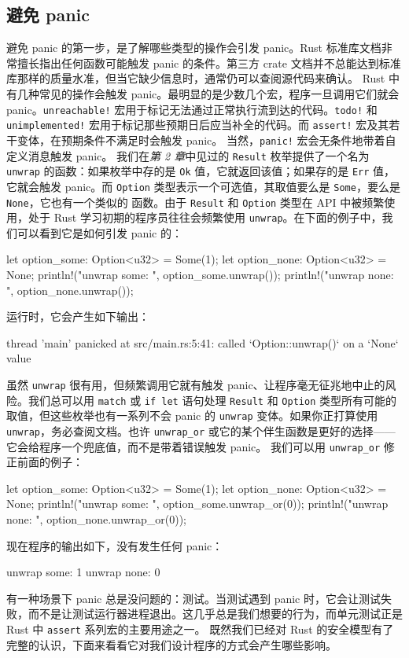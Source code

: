 \subsection{避免 panic}
\label{idx:idx_98423391}
避免 panic 的第一步，是了解哪些类型的操作会引发 panic。Rust 标准库文档非常擅长指出任何函数可能触发 panic 的条件。第三方 crate 文档并不总能达到标准库那样的质量水准，但当它缺少信息时，通常仍可以查阅源代码来确认。
Rust 中有几种常见的操作会触发 panic。最明显的是少数几个宏，程序一旦调用它们就会 panic。\texttt{unreachable!} 宏用于标记无法通过正常执行流到达的代码。\texttt{todo!} 和
\texttt{unimplemented!} 宏用于标记那些预期日后应当补全的代码。而
\texttt{assert!} 宏及其若干变体，在预期条件不满足时会触发 panic。
当然，\texttt{panic!} 宏会无条件地带着自定义消息触发 panic。
我们在\emph{第 2 章}中见过的 \texttt{Result} 枚举提供了一个名为 \texttt{unwrap} 的函数：如果枚举中存的是 \texttt{Ok} 值，它就返回该值；如果存的是 \texttt{Err} 值，它就会触发 panic。而
\texttt{Option} 类型表示一个可选值，其取值要么是 \texttt{Some}，要么是 \texttt{None}，它也有一个类似的
函数。由于 \texttt{Result} 和 \texttt{Option} 类型在 API 中被频繁使用，处于 Rust 学习初期的程序员往往会频繁使用 \texttt{unwrap}。在下面的例子中，我们可以看到它是如何引发 panic 的：
\begin{codebox}[rust]
let option_some: Option<u32> = Some(1);
let option_none: Option<u32> = None;
println!("unwrap some: {}", option_some.unwrap());
println!("unwrap none: {}", option_none.unwrap());
\end{codebox}
运行时，它会产生如下输出：
\begin{codebox}[rust]
thread 'main' panicked at src/main.rs:5:41:
called `Option::unwrap()` on a `None` value
\end{codebox}
\label{idx:idx_96896a5d}
虽然 \texttt{unwrap} 很有用，但频繁调用它就有触发 panic、让程序毫无征兆地中止的风险。我们总可以用 \texttt{match} 或 \texttt{if let} 语句处理 \texttt{Result} 和 \texttt{Option} 类型所有可能的取值，但这些枚举也有一系列不会 panic 的 \texttt{unwrap} 变体。如果你正打算使用 \texttt{unwrap}，务必查阅文档。也许 \texttt{unwrap\_or} 或它的某个伴生函数是更好的选择——它会给程序一个兜底值，而不是带着错误触发 panic。
我们可以用 \texttt{unwrap\_or} 修正前面的例子：
\begin{codebox}[rust]
let option_some: Option<u32> = Some(1);
let option_none: Option<u32> = None;
println!("unwrap some: {}", option_some.unwrap_or(0));
println!("unwrap none: {}", option_none.unwrap_or(0));
\end{codebox}
现在程序的输出如下，没有发生任何 panic：
\begin{codeboxdark}
unwrap some: 1
unwrap none: 0
\end{codeboxdark}
有一种场景下 panic 总是没问题的：测试。当测试遇到 panic 时，它会让测试失败，而不是让测试运行器进程退出。这几乎总是我们想要的行为，而单元测试正是 Rust 中 \texttt{assert} 系列宏的主要用途之一。
既然我们已经对 Rust 的安全模型有了完整的认识，下面来看看它对我们设计程序的方式会产生哪些影响。
